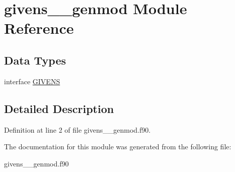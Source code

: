 \hypertarget{classgivens____genmod}{\section{givens\+\_\+\+\_\+genmod Module Reference}
\label{classgivens____genmod}
}
\subsection*{Data Types}
\begin{DoxyCompactItemize}
\item 
interface \hyperlink{interfacegivens____genmod_1_1_g_i_v_e_n_s}{G\+I\+V\+E\+N\+S}
\end{DoxyCompactItemize}


\subsection{Detailed Description}


Definition at line 2 of file givens\+\_\+\+\_\+genmod.\+f90.



The documentation for this module was generated from the following file\+:\begin{DoxyCompactItemize}
\item 
givens\+\_\+\+\_\+genmod.\+f90\end{DoxyCompactItemize}

